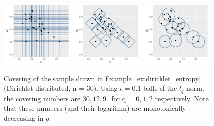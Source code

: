 \documentclass[12pt, twoside]{article}
\newcommand{\1}{\mathbb{1}}
\begin{document}
\begin{figure}[ht]
    \centering
    \includegraphics[width=0.32\textwidth]{plots/l0_covering.pdf}
    \includegraphics[width=0.32\textwidth]{plots/l1_covering.pdf}
    \includegraphics[width=0.32\textwidth]{plots/l2_covering.pdf}
    \caption{Covering of the sample drawn in Example~\ref{ex:dirichlet_entropy} (Dirichlet distributed, n = 30). Using $\epsilon = 0.1$ balls of the $l_q$ norm, the covering numbers are $30, 12, 9,$ for q = $0, 1, 2$ respectively. Note that these numbers (and their logarithm) are monotonically decreasing in $q$.}
    \label{fig:dir_met_ent}
\end{figure}



\clearpage
 
{}

\end{document}
